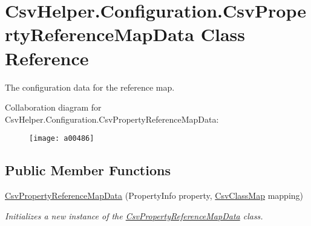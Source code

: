 \hypertarget{a00066}{\section{Csv\-Helper.\-Configuration.\-Csv\-Property\-Reference\-Map\-Data Class Reference}
\label{a00066}
}


The configuration data for the reference map.  




Collaboration diagram for Csv\-Helper.\-Configuration.\-Csv\-Property\-Reference\-Map\-Data\-:
\nopagebreak
\begin{figure}[H]
\begin{center}
\leavevmode
\texttt{[image: a00486]}
\end{center}
\end{figure}
\subsection*{Public Member Functions}
\begin{DoxyCompactItemize}
\item 
\hyperlink{a00066_ad6fe2913932a9fe434f8a908dec30e8b}{Csv\-Property\-Reference\-Map\-Data} (Property\-Info property, \hyperlink{a00050}{Csv\-Class\-Map} mapping)
\begin{DoxyCompactList}\small\item\em Initializes a new instance of the \hyperlink{a00066}{Csv\-Property\-Reference\-Map\-Data} class. \end{DoxyCompactList}\end{DoxyCompactItemize}
